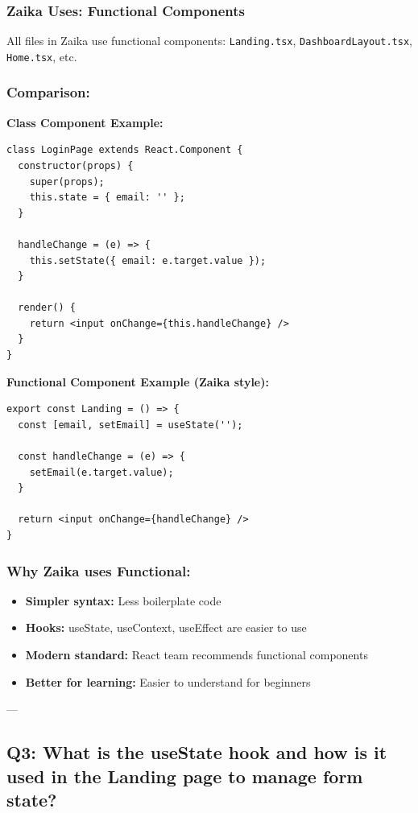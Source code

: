 \documentclass[12pt]{article}
\begin{document}
\subsubsection*{Zaika Uses: Functional Components}

All files in Zaika use functional components: \texttt{Landing.tsx}, \texttt{DashboardLayout.tsx}, \texttt{Home.tsx}, etc.

\subsubsection*{Comparison:}

\textbf{Class Component Example:}
\begin{lstlisting}
class LoginPage extends React.Component {
  constructor(props) {
    super(props);
    this.state = { email: '' };
  }
  
  handleChange = (e) => {
    this.setState({ email: e.target.value });
  }
  
  render() {
    return <input onChange={this.handleChange} />
  }
}
\end{lstlisting}

\textbf{Functional Component Example (Zaika style):}
\begin{lstlisting}
export const Landing = () => {
  const [email, setEmail] = useState('');
  
  const handleChange = (e) => {
    setEmail(e.target.value);
  }
  
  return <input onChange={handleChange} />
}
\end{lstlisting}

\subsubsection*{Why Zaika uses Functional:}
\begin{itemize}
    \item \textbf{Simpler syntax:} Less boilerplate code
    \item \textbf{Hooks:} useState, useContext, useEffect are easier to use
    \item \textbf{Modern standard:} React team recommends functional components
    \item \textbf{Better for learning:} Easier to understand for beginners
\end{itemize}

---

\subsection{Q3: What is the useState hook and how is it used in the Landing page to manage form state?}
\end{document}
